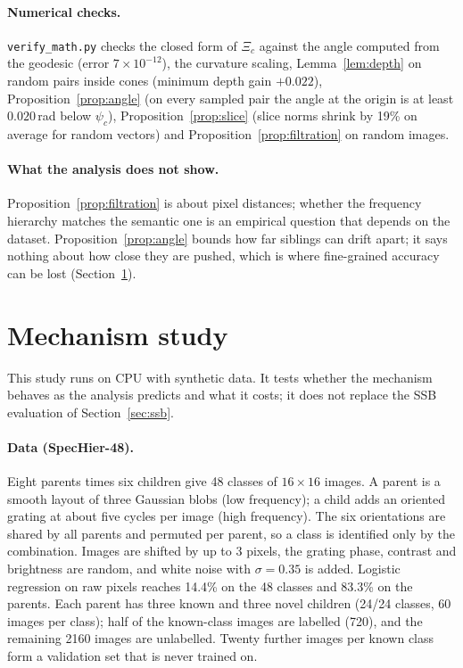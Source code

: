 \documentclass[10pt]{article}
\begin{document}
\paragraph{Numerical checks.} \texttt{verify\_math.py} checks the closed form of $\Xi_c$ against the angle
computed from the geodesic (error $7\times10^{-12}$), the curvature scaling, Lemma~\ref{lem:depth} on random
pairs inside cones (minimum depth gain $+0.022$), Proposition~\ref{prop:angle} (on every sampled pair the angle at the
origin is at least $0.020$\,rad below $\psi_c$), Proposition~\ref{prop:slice} (slice norms shrink by 19\% on average
for random vectors) and Proposition~\ref{prop:filtration} on random images.

\paragraph{What the analysis does not show.} Proposition~\ref{prop:filtration} is about pixel distances; whether
the frequency hierarchy matches the semantic one is an empirical question that depends on the dataset.
Proposition~\ref{prop:angle} bounds how far siblings can drift apart; it says nothing about how close they are
pushed, which is where fine-grained accuracy can be lost (Section~\ref{sec:mech}).

\section{Mechanism study}\label{sec:mech}
This study runs on CPU with synthetic data. It tests whether the mechanism behaves as the analysis predicts
and what it costs; it does not replace the SSB evaluation of Section~\ref{sec:ssb}.

\paragraph{Data (SpecHier-48).} Eight parents times six children give 48 classes of $16\times16$ images. A
parent is a smooth layout of three Gaussian blobs (low frequency); a child adds an oriented grating at about
five cycles per image (high frequency). The six orientations are shared by all parents and permuted per parent,
so a class is identified only by the combination. Images are shifted by up to 3 pixels, the grating phase,
contrast and brightness are random, and white noise with $\sigma=0.35$ is added. Logistic regression on raw
pixels reaches 14.4\% on the 48 classes and 83.3\% on the parents.
Each parent has three known and three novel children (24/24 classes, 60 images per class); half of the
known-class images are labelled (720), and the remaining 2160 images are unlabelled. Twenty further images per
known class form a validation set that is never trained on.
\end{document}
